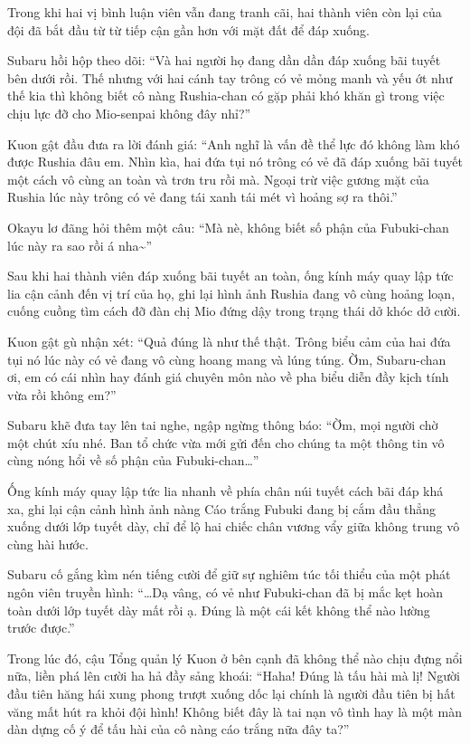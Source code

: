 \documentclass[../main.tex]{subfiles}
\begin{document}
Trong khi hai vị bình luận viên vẫn đang tranh cãi, hai thành viên còn lại của đội đã bắt đầu từ từ tiếp cận gần hơn với mặt đất để đáp xuống.

Subaru hồi hộp theo dõi: ``Và hai người họ đang dần dần đáp xuống bãi tuyết bên dưới rồi. Thế nhưng với hai cánh tay trông có vẻ mỏng manh và yếu ớt như thế kia thì không biết cô nàng Rushia-chan có gặp phải khó khăn gì trong việc chịu lực đỡ cho Mio-senpai không đây nhỉ?''

Kuon gật đầu đưa ra lời đánh giá: ``Anh nghĩ là vấn đề thể lực đó không làm khó được Rushia đâu em. Nhìn kìa, hai đứa tụi nó trông có vẻ đã đáp xuống bãi tuyết một cách vô cùng an toàn và trơn tru rồi mà. Ngoại trừ việc gương mặt của Rushia lúc này trông có vẻ đang tái xanh tái mét vì hoảng sợ ra thôi.''

Okayu lơ đãng hỏi thêm một câu: ``Mà nè, không biết số phận của Fubuki-chan lúc này ra sao rồi á nha\~{}''

Sau khi hai thành viên đáp xuống bãi tuyết an toàn, ống kính máy quay lập tức lia cận cảnh đến vị trí của họ, ghi lại hình ảnh Rushia đang vô cùng hoảng loạn, cuống cuồng tìm cách đỡ đàn chị Mio đứng dậy trong trạng thái dở khóc dở cười.

Kuon gật gù nhận xét: ``Quả đúng là như thế thật. Trông biểu cảm của hai đứa tụi nó lúc này có vẻ đang vô cùng hoang mang và lúng túng. Ờm, Subaru-chan ơi, em có cái nhìn hay đánh giá chuyên môn nào về pha biểu diễn đầy kịch tính vừa rồi không em?''

Subaru khẽ đưa tay lên tai nghe, ngập ngừng thông báo: ``Ờm, mọi người chờ một chút xíu nhé. Ban tổ chức vừa mới gửi đến cho chúng ta một thông tin vô cùng nóng hổi về số phận của Fubuki-chan\dots''

Ống kính máy quay lập tức lia nhanh về phía chân núi tuyết cách bãi đáp khá xa, ghi lại cận cảnh hình ảnh nàng Cáo trắng Fubuki đang bị cắm đầu thẳng xuống dưới lớp tuyết dày, chỉ để lộ hai chiếc chân vương vẩy giữa không trung vô cùng hài hước.

Subaru cố gắng kìm nén tiếng cười để giữ sự nghiêm túc tối thiểu của một phát ngôn viên truyền hình: ``\dots Dạ vâng, có vẻ như Fubuki-chan đã bị mắc kẹt hoàn toàn dưới lớp tuyết dày mất rồi ạ. Đúng là một cái kết không thể nào lường trước được.''

Trong lúc đó, cậu Tổng quản lý Kuon ở bên cạnh đã không thể nào chịu đựng nổi nữa, liền phá lên cười ha hả đầy sảng khoái: ``Haha! Đúng là tấu hài mà lị! Người đầu tiên hăng hái xung phong trượt xuống dốc lại chính là người đầu tiên bị hất văng mất hút ra khỏi đội hình! Không biết đây là tai nạn vô tình hay là một màn dàn dựng cố ý để tấu hài của cô nàng cáo trắng nữa đây ta?''
\end{document}
